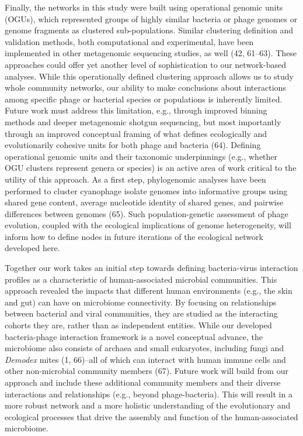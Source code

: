 \documentclass[12pt,]{article}
\begin{document}
Finally, the networks in this study were built using operational genomic
units (OGUs), which represented groups of highly similar bacteria or
phage genomes or genome fragments as clustered sub-populations. Similar
clustering definition and validation methods, both computational and
experimental, have been implemented in other metagenomic sequencing
studies, as well (42, 61--63). These approaches could offer yet another
level of sophistication to our network-based analyses. While this
operationally defined clustering approach allows us to study whole
community networks, our ability to make conclusions about interactions
among specific phage or bacterial species or populations is inherently
limited. Future work must address this limitation, e.g., through
improved binning methods and deeper metagenomic shotgun sequencing, but
most importantly through an improved conceptual framing of what defines
ecologically and evolutionarily cohesive units for both phage and
bacteria (64). Defining operational genomic units and their taxonomic
underpinnings (e.g., whether OGU clusters represent genera or species)
is an active area of work critical to the utility of this approach. As a
first step, phylogenomic analyses have been performed to cluster
cyanophage isolate genomes into informative groups using shared gene
content, average nucleotide identity of shared genes, and pairwise
differences between genomes (65). Such population-genetic assessment of
phage evolution, coupled with the ecological implications of genome
heterogeneity, will inform how to define nodes in future iterations of
the ecological network developed here.

Together our work takes an initial step towards defining bacteria-virus
interaction profiles as a characteristic of human-associated microbial
communities. This approach revealed the impacts that different human
environments (e.g., the skin and gut) can have on microbiome
connectivity. By focusing on relationships between bacterial and viral
communities, they are studied as the interacting cohorts they are,
rather than as independent entities. While our developed bacteria-phage
interaction framework is a novel conceptual advance, the microbiome also
consists of archaea and small eukaryotes, including fungi and
\emph{Demodex} mites (1, 66)--all of which can interact with human
immune cells and other non-microbial community members (67). Future work
will build from our approach and include these additional community
members and their diverse interactions and relationships (e.g., beyond
phage-bacteria). This will result in a more robust network and a more
holistic understanding of the evolutionary and ecological processes that
drive the assembly and function of the human-associated microbiome.
\end{document}
